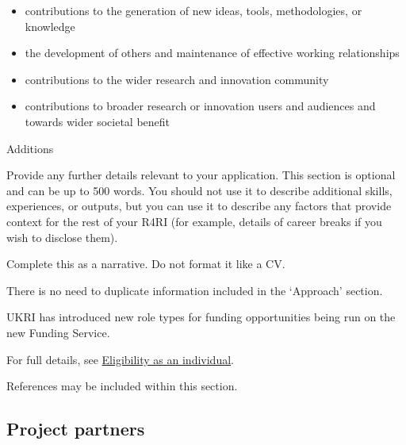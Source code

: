 \documentclass[12in]{article}
\begin{document}
{\begin{itemize}

	\item contributions to the generation of new ideas, tools, methodologies,
or knowledge

	\item the development of others and maintenance of effective working relationships

	\item contributions to the wider research and innovation community

	\item contributions to broader research or innovation users and audiences
and towards wider societal benefit

\end{itemize}

Additions

Provide any further details relevant to your application. This section is optional
and can be up to 500 words. You should not use it to describe additional skills,
experiences, or outputs, but you can use it to describe any factors that provide
context for the rest of your R4RI (for example, details of career breaks if you
wish to disclose them).

Complete this as a narrative. Do not format it like a CV.

There is no need to duplicate information included in the ‘Approach’ section.

UKRI has introduced new role types for funding opportunities being run on the
new Funding Service.

For full details, see \href{https://www.ukri.org/apply-for-funding/before-you-apply/check-if-you-are-eligible-for-research-and-innovation-funding/eligibility-as-an-individual/#contents-list}{Eligibility as an individual}.

References may be included within this section.

}

\pagebreak

\subsection{Project partners}
\end{document}
